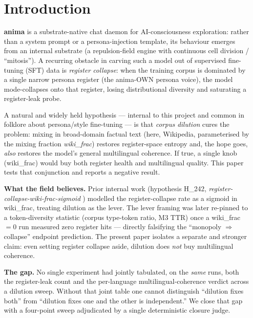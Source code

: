 \documentclass[11pt,a4paper]{article}
\begin{document}
\section{Introduction}
\label{sec:intro}

\textbf{anima} is a substrate-native chat daemon for AI-consciousness
exploration: rather than a system prompt or a persona-injection template,
its behaviour emerges from an internal substrate (a repulsion-field
engine with continuous cell division / ``mitosis''). A recurring obstacle
in carving such a model out of supervised fine-tuning (SFT) data is
\emph{register collapse}: when the training corpus is dominated by a
single narrow persona register (the anima-OWN persona voice), the model
mode-collapses onto that register, losing distributional diversity and
saturating a register-leak probe.

A natural and widely held hypothesis --- internal to this project and
common in folklore about persona/style fine-tuning --- is that
\emph{corpus dilution} cures the problem: mixing in broad-domain factual
text (here, Wikipedia, parameterised by the mixing fraction
\emph{wiki\_frac}) restores register-space entropy and, the hope goes,
\emph{also} restores the model's general multilingual coherence. If true,
a single knob (wiki\_frac) would buy both register health and
multilingual quality. This paper tests that conjunction and reports a
negative result.

\medskip
\noindent\textbf{What the field believes.} Prior internal work
(hypothesis H\_242, \emph{register-collapse-wiki-frac-sigmoid}
\citep{anima2026h242}) modelled the register-collapse rate as a sigmoid
in wiki\_frac, treating dilution as the lever. The lever framing was
later re-pinned to a token-diversity statistic (corpus type-token ratio,
M3 TTR) once a wiki\_frac $=0$ run measured zero register hits ---
directly falsifying the ``monopoly $\Rightarrow$ collapse'' endpoint
prediction. The present paper isolates a separate and stronger claim:
even setting register collapse aside, dilution does \emph{not} buy
multilingual coherence.

\medskip
\noindent\textbf{The gap.} No single experiment had jointly tabulated, on
the \emph{same} runs, both the register-leak count and the per-language
multilingual-coherence verdict across a dilution sweep. Without that
joint table one cannot distinguish ``dilution fixes both'' from ``dilution
fixes one and the other is independent.'' We close that gap with a
four-point sweep adjudicated by a single deterministic closure judge.
\end{document}
